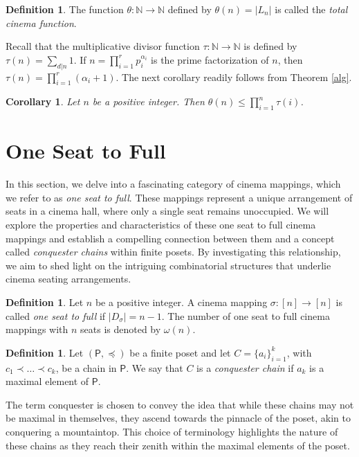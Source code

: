 \documentclass{amsart}
\newtheorem{corollary}[theorem]{Corollary}
\theoremstyle{definition}
\newtheorem{definition}[theorem]{Definition}
\begin{document}
\begin{definition}
The function $\theta:\mathbb{N}\to\mathbb{N}$ defined by $\theta(n)=|L_n|$ is called the \textit{total cinema function}.
\end{definition}
Recall that the multiplicative divisor function $\tau:\mathbb{N}\to\mathbb{N}$ is defined by $\tau(n)=\sum_{d|n}1$. If $n=\prod_{i=1}^r p_i^{\alpha_i}$ is the prime factorization of $n$, then $\tau(n)=\prod_{i=1}^r(\alpha_i+1)$. The next corollary readily follows from Theorem \ref{alg}.
\begin{corollary}
Let $n$ be a positive integer. Then $\theta(n)\leqslant \prod_{i=1}^n\tau(i)$. 
\end{corollary}

\section{One Seat to Full}

In this section, we delve into a fascinating category of cinema mappings, which we refer to as \textit{one seat to full}. These mappings represent a unique arrangement of seats in a cinema hall, where only a single seat remains unoccupied. We will explore the properties and characteristics of these one seat to full cinema mappings and establish a compelling connection between them and a concept called \textit{conquester chains} within finite posets. By investigating this relationship, we aim to shed light on the intriguing combinatorial structures that underlie cinema seating arrangements.

\begin{definition}
Let $n$ be a positive integer. A cinema mapping $\sigma:[n]\to[n]$ is called \textit{one seat to full} if $|D_\sigma|=n-1$. The number of one seat to full cinema mappings with $n$ seats is denoted by $\omega(n)$.
\end{definition}

\begin{definition}
Let $(\mathsf{P},\preceq)$ be a finite poset and let $C=\{a_i\}_{i=1}^k$, with $c_1\prec \ldots\prec c_k$, be a chain in $\mathsf{P}$. We say that $C$ is a \textit{conquester chain} if $a_k$ is a maximal element of $\mathsf{P}$. 
\end{definition}

The term conquester is chosen to convey the idea that while these chains may not be maximal in themselves, they ascend towards the pinnacle of the poset, akin to conquering a mountaintop. This choice of terminology highlights the nature of these chains as they reach their zenith within the maximal elements of the poset.
\end{document}
